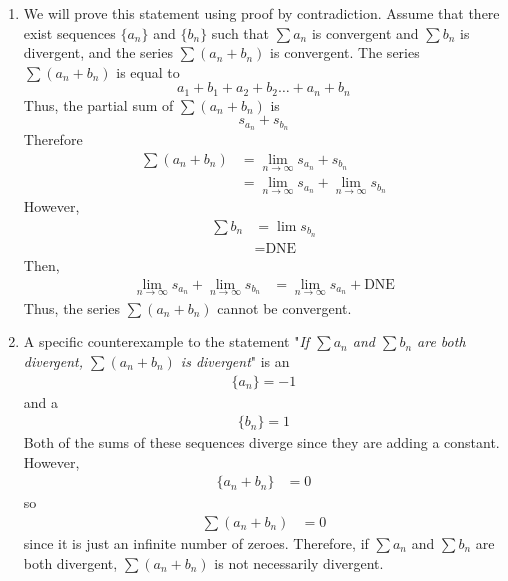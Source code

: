 \documentclass{article}
\begin{document}
\begin{enumerate}[label=\textbf{(10.\arabic*)}]
\begin{enumerate}
\item We will prove this statement using proof by contradiction. Assume that there exist sequences $\{a_n\}$ and $\{b_n\}$ such that $\sum a_n$ is convergent and $\sum b_n$ is divergent, and the series $\sum(a_n+b_n)$ is convergent. The series $\sum(a_n+b_n)$ is equal to 
\[a_1+b_1+a_2+b_2\ldots+a_n+b_n\]
Thus, the partial sum of $\sum(a_n+b_n)$ is 
\[s_{a_n}+s_{b_n}\]
Therefore
\begin{align*}
\sum(a_n+b_n) &= \lim_{n\to\infty} s_{a_n}+s_{b_n}\\
&=\lim_{n\to\infty} s_{a_n}+\lim_{n\to\infty} s_{b_n}
\end{align*}
However,
\begin{align*}
\sum b_n &= \lim s_{b_n}\\
&= \text{DNE }
\end{align*}
Then, 
\begin{align*}
\lim_{n\to\infty} s_{a_n}+\lim_{n\to\infty} s_{b_n} &= \lim_{n\to\infty} s_{a_n} + \text{DNE}
\end{align*}
Thus, the series $\sum(a_n+b_n)$ cannot be convergent.

\item A specific counterexample to the statement "\textit{If $\sum a_n$ and $\sum b_n$ are both divergent, $\sum(a_n+b_n)$ is divergent}" is an 
\begin{align*}
\{a_n\}=-1
\end{align*} and a 
\begin{align*}
\{b_n\}=1
\end{align*}
Both of the sums of these sequences diverge since they are adding a constant. However,
\begin{align*}
\{a_n+b_n\} &= 0
\end{align*}
so 
\begin{align*}
\sum(a_n+b_n) &= 0
\end{align*}
since it is just an infinite number of zeroes. Therefore, if $\sum a_n$ and $\sum b_n$ are both divergent, $\sum (a_n+b_n)$ is not necessarily divergent.

\end{enumerate}

\end{enumerate}
\end{document}
